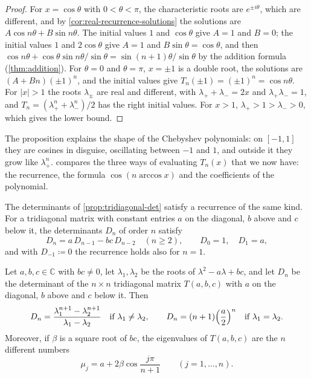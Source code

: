 \begin{proof}
For $x=\cos\theta$ with $0<\theta<\pi$, the characteristic roots are $e^{\pm i\theta}$, which are different, and by \cref{cor:real-recurrence-solutions} the solutions are $A\cos n\theta+B\sin n\theta$. The initial values $1$ and $\cos\theta$ give $A=1$ and $B=0$; the initial values $1$ and $2\cos\theta$ give $A=1$ and $B\sin\theta=\cos\theta$, and then $\cos n\theta+\cos\theta\sin n\theta/\sin\theta=\sin(n+1)\theta/\sin\theta$ by the addition formula (\cref{thm:addition}). For $\theta=0$ and $\theta=\pi$, $x=\pm1$ is a double root, the solutions are $(A+Bn)(\pm1)^n$, and the initial values give $T_n(\pm1)=(\pm1)^n=\cos n\theta$. For $|x|>1$ the roots $\lambda_\pm$ are real and different, with $\lambda_++\lambda_-=2x$ and $\lambda_+\lambda_-=1$, and $T_n=(\lambda_+^n+\lambda_-^n)/2$ has the right initial values. For $x>1$, $\lambda_+>1>\lambda_->0$, which gives the lower bound.
\end{proof}

The proposition explains the shape of the Chebyshev polynomials: on $[-1,1]$ they are cosines in disguise, oscillating between $-1$ and $1$, and outside it they grow like $\lambda_+^n$.  compares the three ways of evaluating $T_n(x)$ that we now have: the recurrence, the formula $\cos(n\arccos x)$ and the coefficients of the polynomial.

The determinants of \cref{prop:tridiagonal-det} satisfy a recurrence of the same kind. For a tridiagonal matrix with constant entries $a$ on the diagonal, $b$ above and $c$ below it, the determinants $D_n$ of order $n$ satisfy
\[
D_n=a\,D_{n-1}-bc\,D_{n-2}\quad(n\ge2),\qquad D_0=1,\quad D_1=a ,
\]
and with $D_{-1}\coloneqq0$ the recurrence holds also for $n=1$.

\begin{proposition}
\label{prop:tridiagonal-closed}
Let $a,b,c\in\mathbb C$ with $bc\ne0$, let $\lambda_1,\lambda_2$ be the roots of $\lambda^2-a\lambda+bc$, and let $D_n$ be the determinant of the $n\times n$ tridiagonal matrix $T(a,b,c)$ with $a$ on the diagonal, $b$ above and $c$ below it. Then
\[
D_n=\frac{\lambda_1^{n+1}-\lambda_2^{n+1}}{\lambda_1-\lambda_2}\quad\text{if }\lambda_1\ne\lambda_2,\qquad D_n=(n+1)\Bigl(\frac a2\Bigr)^n\quad\text{if }\lambda_1=\lambda_2 .
\]
Moreover, if $\beta$ is a square root of $bc$, the eigenvalues of $T(a,b,c)$ are the $n$ different numbers
\[
\mu_j=a+2\beta\cos\frac{j\pi}{n+1}\qquad(j=1,\ldots,n).
\]
\end{proposition}

